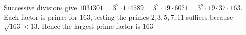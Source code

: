 Successive divisions give $1031301=3^2\cdot114589=3^2\cdot19\cdot6031=3^2\cdot19\cdot37\cdot163$. Each factor is prime; for $163$, testing the primes $2,3,5,7,11$ suffices because $\sqrt{163}<13$. Hence the largest prime factor is $\boxed{163}$.
